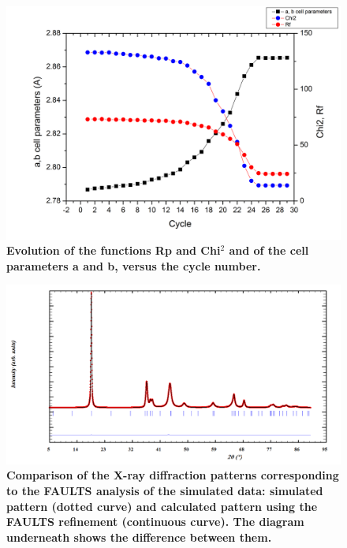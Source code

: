 \begin{figure}[!htbp]
\begin{center}
\includegraphics [width=4 in]{Rp_Chi2_ab_grafika.png}
\caption{\bf Evolution of the functions Rp and Chi$^{2}$ and of the cell parameters a and b, versus the cycle number. }
\label{cycles}
\end{center}
\end{figure}

\begin{figure}
\begin{center}
\includegraphics [width=6 in]{pattern.png}
\caption{\bf Comparison of the X-ray diffraction patterns corresponding to the FAULTS analysis of the simulated data: simulated pattern (dotted curve) and calculated pattern using the FAULTS refinement (continuous curve). The diagram underneath shows the difference between them.  }
\label{sim}
\end{center}
\end{figure}
